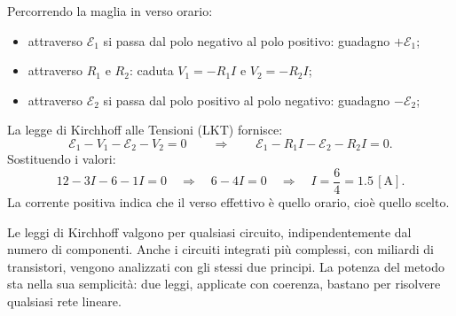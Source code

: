 \begin{esempio}
\begin{center}
\end{center}







Percorrendo la maglia in verso orario:
\begin{itemize}[leftmargin=1cm]
  \item attraverso \(\mathcal{E}_1\) si passa dal polo negativo al polo positivo: guadagno \(+\mathcal{E}_1\);
  \item attraverso \(R_1\) e \(R_2\): caduta \(V_1 = -R_1 I\) e \(V_2 = -R_2 I\);
  \item attraverso \(\mathcal{E}_2\) si passa dal polo positivo al polo negativo: guadagno \(-\mathcal{E}_2\);
\end{itemize}

La legge di Kirchhoff alle Tensioni (LKT) fornisce:
\[
\mathcal{E}_1 - V_1 - \mathcal{E}_2 - V_2 = 0 \qquad\Longrightarrow\qquad
\mathcal{E}_1 - R_1 I - \mathcal{E}_2 - R_2 I = 0.
\]
Sostituendo i valori:
\[
12 - 3I - 6 - 1I = 0
\quad\Rightarrow\quad
6 - 4I = 0
\quad\Rightarrow\quad
I = \frac{6}{4} = 1.5\,[\text{A}].
\]
La corrente positiva indica che il verso effettivo è quello orario, cioè quello scelto.
\end{esempio}

\begin{curiosita}
Le leggi di Kirchhoff valgono per qualsiasi circuito, indipendentemente dal numero di componenti. Anche i circuiti integrati più complessi, con miliardi di transistori, vengono analizzati con gli stessi due principi. La potenza del metodo sta nella sua semplicità: due leggi, applicate con coerenza, bastano per risolvere qualsiasi rete lineare.
\end{curiosita}





